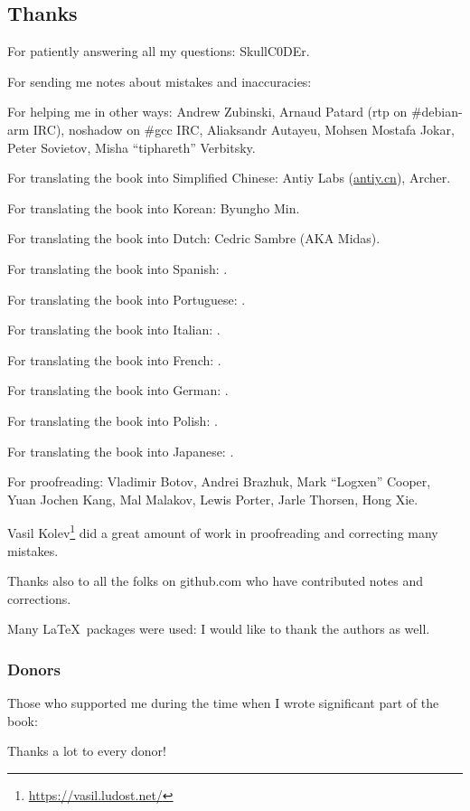 \subsection*{Thanks}

For patiently answering all my questions: SkullC0DEr.

For sending me notes about mistakes and inaccuracies: \PeopleMistakesInaccuracies{}

For helping me in other ways:
Andrew Zubinski,
Arnaud Patard (rtp on \#debian-arm IRC),
noshadow on \#gcc IRC,
Aliaksandr Autayeu,
Mohsen Mostafa Jokar,
Peter Sovietov,
Misha ``tiphareth'' Verbitsky.

For translating the book into Simplified Chinese:
Antiy Labs (\href{http://antiy.cn}{antiy.cn}), Archer.

For translating the book into Korean: Byungho Min.

For translating the book into Dutch: Cedric Sambre (AKA Midas).

For translating the book into Spanish: \PeopleSpanishTranslators{}.

For translating the book into Portuguese: \PeoplePTBRTranslators{}.

For translating the book into Italian: \PeopleItalianTranslators{}.

For translating the book into French: \PeopleFrenchTranslators{}.

For translating the book into German: \PeopleGermanTranslators{}.

For translating the book into Polish: \PeoplePolishTranslators{}.

For translating the book into Japanese: \PeopleJapaneseTranslators{}.

For proofreading:
Vladimir Botov,
Andrei Brazhuk,
Mark ``Logxen'' Cooper, Yuan Jochen Kang, Mal Malakov, Lewis Porter, Jarle Thorsen, Hong Xie.

Vasil Kolev\footnote{\url{https://vasil.ludost.net/}} did a great amount of work in proofreading and correcting many mistakes.

Thanks also to all the folks on github.com who have contributed notes and corrections.

Many \LaTeX\ packages were used: I would like to thank the authors as well.

\subsubsection*{Donors}

Those who supported me during the time when I wrote significant part of the book:



Thanks a lot to every donor!
